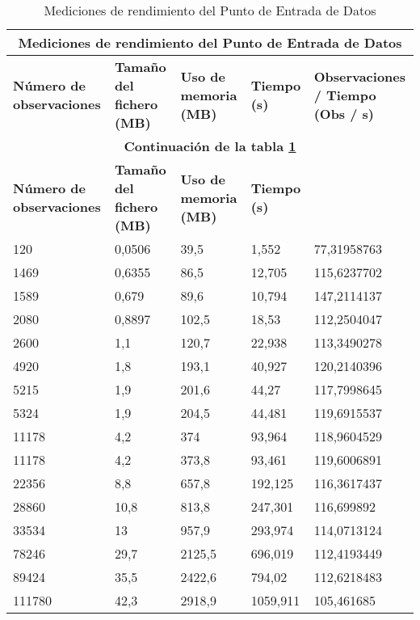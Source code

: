 \begin{landscape}
	\begin{longtable}[c]{|p{30mm}|p{30mm}|p{30mm}|p{30mm}|p{30mm}|}
		 \caption{Mediciones de rendimiento del Punto de Entrada de Datos\label{table:mediciones_receiver}}\\
		
		 \hline
		 \multicolumn{5}{|c|}{\textbf{Mediciones de rendimiento del Punto de Entrada de Datos}}\\
		 \hline
		 \textbf{Número de observaciones} & \textbf{Tamaño del fichero (MB)} & \textbf{Uso de memoria (MB)} & \textbf{Tiempo (s)} & \textbf{Observaciones / Tiempo (Obs / s)}\\
		 \hline
		 \hline
		 \endfirsthead
		 
		 \hline
		 \multicolumn{5}{|c|}{\textbf{Continuación de la tabla \ref{table:mediciones_receiver}}}\\
		 \hline
		 \textbf{Número de observaciones} & \textbf{Tamaño del fichero (MB)} & \textbf{Uso de memoria (MB)} & \textbf{Tiempo (s)}\\
		 \hline
		 \hline
		 \endhead
		 
		 \hline
		 \endfoot
		 
		120 & 0,0506 & 39,5 & 1,552 & 77,31958763\\
		\hline
		1469 & 0,6355 & 86,5 & 12,705 & 115,6237702\\
		\hline
		1589 & 0,679 & 89,6 & 10,794 & 147,2114137\\
		\hline
		2080 & 0,8897 & 102,5 & 18,53 & 112,2504047\\
		\hline
		2600 & 1,1 & 120,7 & 22,938 & 113,3490278\\
		\hline
		4920 & 1,8 & 193,1 & 40,927 & 120,2140396\\
		\hline
		5215 & 1,9 & 201,6 & 44,27 & 117,7998645\\
		\hline
		5324 & 1,9 & 204,5 & 44,481 & 119,6915537\\
		\hline
		11178 & 4,2 & 374 & 93,964 & 118,9604529\\
		\hline
		11178 & 4,2 & 373,8 & 93,461 & 119,6006891\\
		\hline
		22356 & 8,8 & 657,8 & 192,125 & 116,3617437\\
		\hline
		28860 & 10,8 & 813,8 & 247,301 & 116,699892\\
		\hline
		33534 & 13 & 957,9 & 293,974 & 114,0713124\\
		\hline
		78246 & 29,7 & 2125,5 & 696,019 & 112,4193449\\
		\hline
		89424 & 35,5 & 2422,6 & 794,02 & 112,6218483\\
		\hline
		111780 & 42,3 & 2918,9 & 1059,911 & 105,461685\\
		\hline
		\hline
		
	 \end{longtable}
\end{landscape}